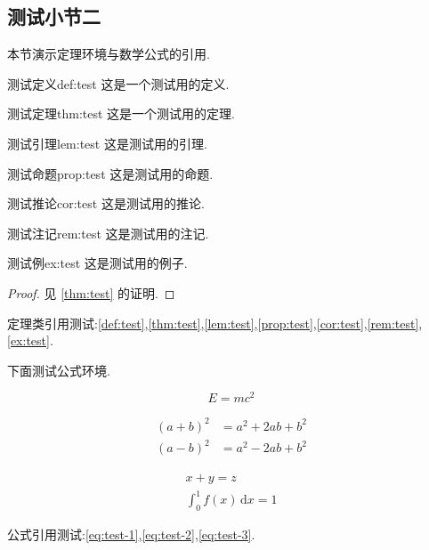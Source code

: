 \subsection{测试小节二}

本节演示定理环境与数学公式的引用.

\begin{definition}{测试定义}{def:test}
    这是一个测试用的定义.
\end{definition}

\begin{theorem}{测试定理}{thm:test}
    这是一个测试用的定理.
\end{theorem}

\begin{lemma}{测试引理}{lem:test}
    这是测试用的引理.
\end{lemma}

\begin{proposition}{测试命题}{prop:test}
    这是测试用的命题.
\end{proposition}

\begin{corollary}{测试推论}{cor:test}
    这是测试用的推论.
\end{corollary}

\begin{remark}{测试注记}{rem:test}
    这是测试用的注记.
\end{remark}

\begin{example}{测试例}{ex:test}
    这是测试用的例子.
\end{example}

\begin{proof}
    见 \autoref{thm:test} 的证明.
\end{proof}

定理类引用测试:\autoref{def:test},\autoref{thm:test},\autoref{lem:test},\autoref{prop:test},\autoref{cor:test},\autoref{rem:test},\autoref{ex:test}.

\medskip

下面测试公式环境.

\begin{equation}\label{eq:test-1}
    E = mc^2
\end{equation}

\begin{align}
    (a+b)^2 &= a^2 + 2ab + b^2 \\
    (a-b)^2 &= a^2 - 2ab + b^2
    \label{eq:test-2}
\end{align}

\begin{gather}
    x + y = z \\
    \int_0^1 f(x)\,\mathrm{d}x = 1
    \label{eq:test-3}
\end{gather}

公式引用测试:\eqref{eq:test-1},\eqref{eq:test-2},\eqref{eq:test-3}.
